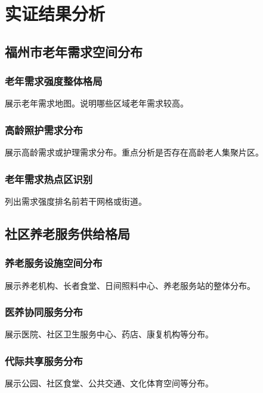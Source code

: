\section{实证结果分析}

\subsection{福州市老年需求空间分布}

\subsubsection{老年需求强度整体格局}

展示老年需求地图。说明哪些区域老年需求较高。

\subsubsection{高龄照护需求分布}

展示高龄需求或护理需求分布。重点分析是否存在高龄老人集聚片区。

\subsubsection{老年需求热点区识别}

列出需求强度排名前若干网格或街道。

\subsection{社区养老服务供给格局}

\subsubsection{养老服务设施空间分布}

展示养老机构、长者食堂、日间照料中心、养老服务站的整体分布。

\subsubsection{医养协同服务分布}

展示医院、社区卫生服务中心、药店、康复机构等分布。

\subsubsection{代际共享服务分布}

展示公园、社区食堂、公共交通、文化体育空间等分布。

